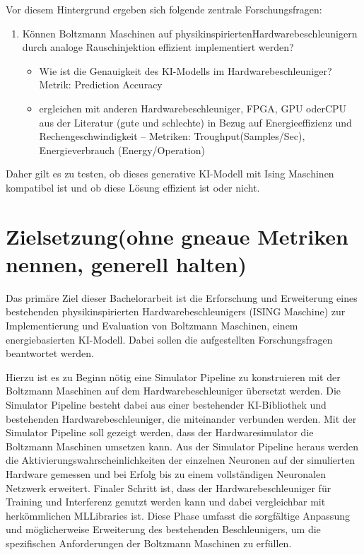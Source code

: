 Vor diesem Hintergrund ergeben sich folgende zentrale Forschungsfragen:

\begin{enumerate}
    \item {Können Boltzmann Maschinen auf physikinspiriertenHardwarebeschleunigern durch analoge Rauschinjektion effizient implementiert werden?}
        \begin{itemize}
            \item Wie ist die Genauigkeit des KI-Modells im Hardwarebeschleuniger? Metrik: Prediction Accuracy

            \item ergleichen mit anderen Hardwarebeschleuniger, FPGA, GPU oderCPU aus der Literatur (gute und schlechte) in Bezug auf Energieeffizienz und Rechengeschwindigkeit – Metriken: Troughput(Samples/Sec), Energieverbrauch (Energy/Operation)
        \end{itemize}  
\end{enumerate}

Daher gilt es zu testen, ob dieses generative KI-Modell mit Ising Maschinen
kompatibel ist und ob diese Lösung effizient ist oder nicht.


\section{Zielsetzung(ohne gneaue Metriken nennen, generell halten)}

Das primäre Ziel dieser Bachelorarbeit ist die Erforschung und Erweiterung eines
bestehenden physikinspirierten Hardwarebeschleunigers (ISING Maschine) zur
Implementierung und Evaluation von Boltzmann Maschinen, einem
energiebasierten KI-Modell. Dabei sollen die aufgestellten Forschungsfragen
beantwortet werden.

Hierzu ist es zu Beginn nötig eine Simulator Pipeline zu konstruieren mit der
Boltzmann Maschinen auf dem Hardwarebeschleuniger übersetzt werden. Die
Simulator Pipeline besteht dabei aus einer bestehender KI-Bibliothek und
bestehenden Hardwarebeschleuniger, die miteinander verbunden werden. Mit der
Simulator Pipeline soll gezeigt werden, dass der Hardwaresimulator die Boltzmann
Maschinen umsetzen kann. Aus der Simulator Pipeline heraus werden die
Aktivierungswahrscheinlichkeiten der einzelnen Neuronen auf der simulierten
Hardware gemessen und bei Erfolg bis zu einem vollständigen Neuronalen
Netzwerk erweitert. Finaler Schritt ist, dass der Hardwarebeschleuniger für Training
und Interferenz genutzt werden kann und dabei vergleichbar mit herkömmlichen MLLibraries ist. Diese Phase umfasst die sorgfältige Anpassung und möglicherweise
Erweiterung des bestehenden Beschleunigers, um die spezifischen Anforderungen
der Boltzmann Maschinen zu erfüllen.

